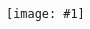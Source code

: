 \documentclass{article}
\newcommand{\figurewrap}[2]{\begin{figure}[h!]
\centering
\texttt{[image: \#1]}
\end{figure}}
\newcommand{\ag}{audioguide1.1.0\xspace}
\begin{document}
\begin{spacing}{1.2}
\figurewrap{image1.png}{1}

%
%
%
%
%
%
%
%
%
%


\end{spacing}
\end{document}
